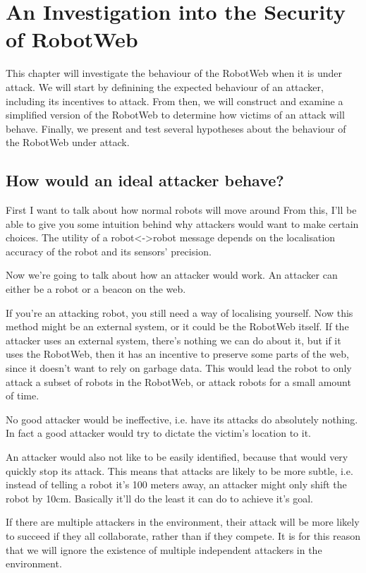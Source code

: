 \chapter{An Investigation into the Security of RobotWeb}

This chapter will investigate the behaviour of the RobotWeb when it is under attack. We will start by definining the expected behaviour of an attacker, including its incentives to attack. From then, we will construct and examine a simplified version of the RobotWeb to determine how victims of an attack will behave. Finally, we present and test several hypotheses about the behaviour of the RobotWeb under attack.

\section{How would an ideal attacker behave?}
First I want to talk about how normal robots will move around
From this, I'll be able to give you some intuition behind why attackers would want to make certain choices.
The utility of a robot<->robot message depends on the localisation accuracy of the robot and its sensors' precision.

Now we're going to talk about how an attacker would work.
An attacker can either be a robot or a beacon on the web.

If you're an attacking robot, you still need a way of localising yourself.
Now this method might be an external system, or it could be the RobotWeb itself.
If the attacker uses an external system, there's nothing we can do about it, but if it uses the RobotWeb,
then it has an incentive to preserve some parts of the web, since it doesn't want to rely on garbage data.
This would lead the robot to only attack a subset of robots in the RobotWeb, or attack robots for a small amount of time.

No good attacker would be ineffective, i.e. have its attacks do absolutely nothing.
In fact a good attacker would try to dictate the victim's location to it.

An attacker would also not like to be easily identified, because that would very quickly stop its attack.
This means that attacks are likely to be more subtle, i.e. instead of telling a robot it's 100 meters away, an attacker might only shift the robot by 10cm.
Basically it'll do the least it can do to achieve it's goal. 

If there are multiple attackers in the environment, their attack will be more likely to succeed if they all collaborate, rather than if they compete.
It is for this reason that we will ignore the existence of multiple independent attackers in the environment.

